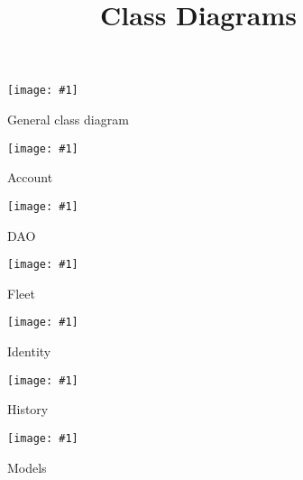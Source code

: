 \documentclass{article}
\newcommand{\diagram}[2]{
	\texttt{[image: \#1]}
	\caption{#2}
}
\newcommand{\vertdiagram}[2]{
	\begin{sidewaysfigure}
		\diagram{#1}{#2}
	\end{sidewaysfigure}
}
\begin{document}
	\title{Class Diagrams}
	\date{}
	\maketitle
	\vertdiagram{Klassediagram}{General class diagram}
	\vertdiagram{ClassDiagramAccount}{Account}
	\vertdiagram{ClassDiagramDAO}{DAO}
	\vertdiagram{ClassDiagramFleet}{Fleet}
	\vertdiagram{ClassDiagramIdentity}{Identity}
	\vertdiagram{ClassDiagramHistory}{History}
	\vertdiagram{ClassDiagramModels}{Models}
\end{document}
